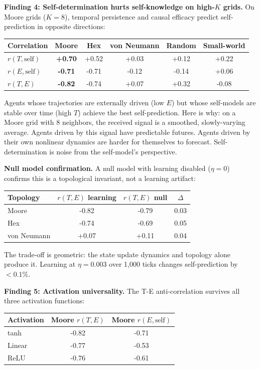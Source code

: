 \documentclass[
  11pt,
]{article}
\begin{document}
\textbf{Finding 4: Self-determination hurts self-knowledge on high-\(K\)
grids.} On Moore grids (\(K = 8\)), temporal persistence and causal
efficacy predict self-prediction in opposite directions:

\begin{longtable}[]{@{}lccccc@{}}
\toprule\noalign{}
Correlation & Moore & Hex & von Neumann & Random & Small-world \\
\midrule\noalign{}
\endhead
\bottomrule\noalign{}
\endlastfoot
\(r(T, \text{self})\) & \textbf{+0.70} & +0.52 & +0.03 & +0.12 &
+0.22 \\
\(r(E, \text{self})\) & \textbf{-0.71} & -0.71 & -0.12 & -0.14 &
+0.06 \\
\(r(T, E)\) & \textbf{-0.82} & -0.74 & +0.07 & +0.32 & -0.08 \\
\end{longtable}

Agents whose trajectories are externally driven (low \(E\)) but whose
self-models are stable over time (high \(T\)) achieve the best
self-prediction. Here is why: on a Moore grid with 8 neighbors, the
received signal is a smoothed, slowly-varying average. Agents driven by
this signal have predictable futures. Agents driven by their own
nonlinear dynamics are harder for themselves to forecast.
Self-determination is noise from the self-model's perspective.

\textbf{Null model confirmation.} A null model with learning disabled
(\(\eta = 0\)) confirms this is a topological invariant, not a learning
artifact:

\begin{longtable}[]{@{}lccc@{}}
\toprule\noalign{}
Topology & \(r(T,E)\) learning & \(r(T,E)\) null & \(\Delta\) \\
\midrule\noalign{}
\endhead
\bottomrule\noalign{}
\endlastfoot
Moore & -0.82 & -0.79 & 0.03 \\
Hex & -0.74 & -0.69 & 0.05 \\
von Neumann & +0.07 & +0.11 & 0.04 \\
\end{longtable}

The trade-off is geometric: the state update dynamics and topology alone
produce it. Learning at \(\eta = 0.003\) over 1,000 ticks changes
self-prediction by \(< 0.1\%\).

\textbf{Finding 5: Activation universality.} The T-E anti-correlation
survives all three activation functions:

\begin{longtable}[]{@{}lcc@{}}
\toprule\noalign{}
Activation & Moore \(r(T,E)\) & Moore \(r(E, \text{self})\) \\
\midrule\noalign{}
\endhead
\bottomrule\noalign{}
\endlastfoot
tanh & -0.82 & -0.71 \\
Linear & -0.77 & -0.53 \\
ReLU & -0.76 & -0.61 \\
\end{longtable}
\end{document}
